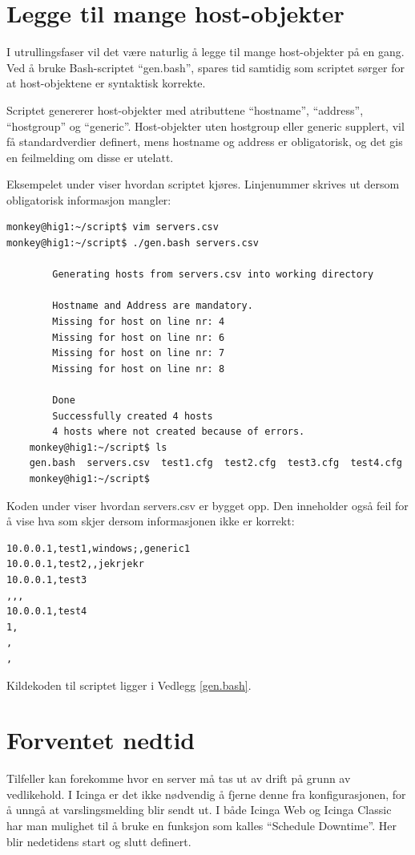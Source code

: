 \section{Legge til mange host-objekter}
I utrullingsfaser vil det være naturlig å legge til mange host-objekter på en gang. Ved å bruke Bash-scriptet ``gen.bash'', spares tid samtidig som scriptet sørger for at host-objektene er syntaktisk korrekte.

Scriptet genererer host-objekter med atributtene  ``hostname'', ``address'', ``hostgroup'' og ``generic''. Host-objekter uten hostgroup eller generic supplert, vil få standardverdier definert, mens hostname og address er obligatorisk, og det gis en feilmelding om disse er utelatt.

Eksempelet under viser hvordan scriptet kjøres. Linjenummer skrives ut dersom obligatorisk informasjon mangler:
\begin{lstlisting}[style=example]
monkey@hig1:~/script$ vim servers.csv
monkey@hig1:~/script$ ./gen.bash servers.csv

		Generating hosts from servers.csv into working directory

		Hostname and Address are mandatory.
		Missing for host on line nr: 4
		Missing for host on line nr: 6
		Missing for host on line nr: 7
		Missing for host on line nr: 8

		Done
		Successfully created 4 hosts
		4 hosts where not created because of errors.
	monkey@hig1:~/script$ ls
	gen.bash  servers.csv  test1.cfg  test2.cfg  test3.cfg  test4.cfg
	monkey@hig1:~/script$
	\end{lstlisting}

Koden under viser hvordan servers.csv er bygget opp. Den inneholder også feil for å vise hva som skjer dersom informasjonen ikke er korrekt:
\begin{lstlisting}
10.0.0.1,test1,windows;,generic1
10.0.0.1,test2,,jekrjekr
10.0.0.1,test3
,,,
10.0.0.1,test4
1,
,
,
\end{lstlisting}

	Kildekoden til scriptet ligger i Vedlegg \ref{gen.bash}.

\section{Forventet nedtid}
Tilfeller kan forekomme hvor en server må tas ut av drift på grunn av vedlikehold. I Icinga er det ikke nødvendig å fjerne denne fra konfigurasjonen, for å unngå at varslingsmelding blir sendt ut. I både Icinga Web og Icinga Classic har man mulighet til å bruke en funksjon som kalles ``Schedule Downtime''. Her blir nedetidens start og slutt definert.


